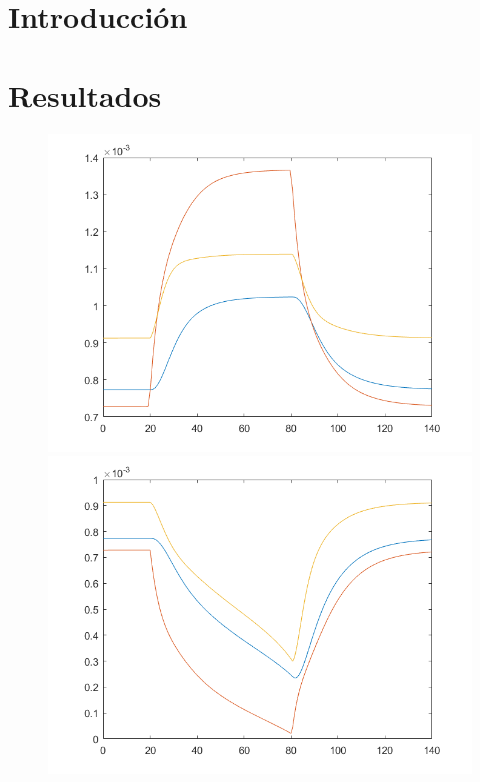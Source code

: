 \section{Introducci\'on}

\section{Resultados}

\begin{figure}[h!]
\centering
\includegraphics[scale=0.3]{../a1.png}\hspace{0.01cm}
\includegraphics[scale=0.3]{../b1.png}\hspace{0.01cm}

\end{figure}
